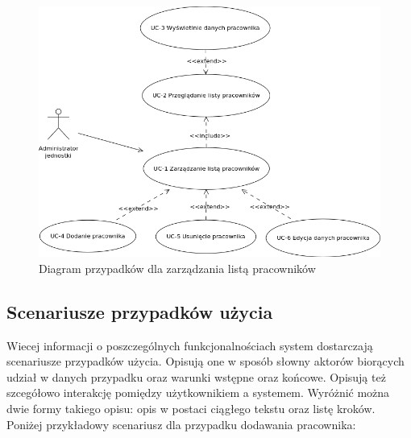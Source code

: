 \begin{figure}[tdh]
    \begin{center}
	\includegraphics[scale=.6]{img/diagram-uc.png}
	\caption{Diagram przypadków dla zarządzania listą pracowników}
	\label{diagram-uc}
    \end{center}
\end{figure}


\subsection[Scenariusze przypadków użycia][Scenariusze przypadków użycia]{Scenariusze przypadków użycia}
Wiecej informacji o poszczególnych funkcjonalnościach system dostarczają scenariusze przypadków użycia. Opisują one w sposób słowny aktorów biorących udział w danych przypadku oraz warunki wstępne oraz końcowe. Opisują też szcegółowo interakcję pomiędzy użytkownikiem a systemem. Wyróżnić można dwie formy takiego opisu: opis w postaci ciągłego tekstu oraz listę kroków. Poniżej przykładowy scenariusz dla przypadku dodawania pracownika:

